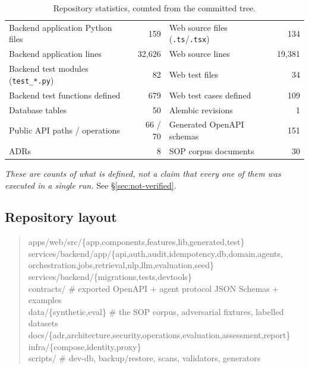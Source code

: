 \documentclass[11pt,a4paper]{article}
\begin{document}
\begin{table}[h]
\centering\small
\caption{Repository statistics, counted from the committed tree.}
\begin{tabular}{@{}lr@{\hspace{2.4em}}lr@{}}
\toprule
Backend application Python files & 159 & Web source files (\texttt{.ts}/\texttt{.tsx}) & 134\\
Backend application lines & 32{,}626 & Web source lines & 19{,}381\\
Backend test modules (\texttt{test\_*.py}) & 82 & Web test files & 34\\
Backend test functions defined & 679 & Web test cases defined & 109\\
Database tables & 50 & Alembic revisions & 1\\
Public API paths / operations & 66 / 70 & Generated OpenAPI schemas & 151\\
ADRs & 8 & SOP corpus documents & 30\\
\bottomrule
\end{tabular}
\end{table}

\emph{These are counts of what is defined, not a claim that every one of them
was executed in a single run.} See \S\ref{sec:not-verified}.

\subsection{Repository layout}

\begin{quote}\small\ttfamily
apps/web/src/\{app,components,features,lib,generated,test\}\\
services/backend/app/\{api,auth,audit,idempotency,db,domain,agents,\\
\hspace*{2em}orchestration,jobs,retrieval,nlp,llm,evaluation,seed\}\\
services/backend/\{migrations,tests,devtools\}\\
contracts/            \# exported OpenAPI + agent protocol JSON Schemas + examples\\
data/\{synthetic,eval\}  \# the SOP corpus, adversarial fixtures, labelled datasets\\
docs/\{adr,architecture,security,operations,evaluation,assessment,report\}\\
infra/\{compose,identity,proxy\}\\
scripts/              \# dev-db, backup/restore, scans, validators, generators
\end{quote}
\end{document}
